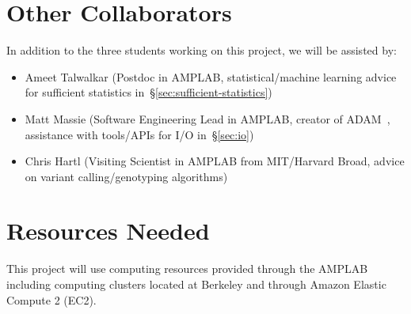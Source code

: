 \documentclass[11pt]{article}
\begin{document}
\section{Other Collaborators}
\label{sec:other-collaborators}

In addition to the three students working on this project, we will be assisted by:

\begin{itemize}
\item Ameet Talwalkar (Postdoc in AMPLAB, statistical/machine learning advice for sufficient statistics in~\S\ref{sec:sufficient-statistics})
\item Matt Massie (Software Engineering Lead in AMPLAB, creator of ADAM~\cite{adam}, assistance with tools/APIs for I/O
in~\S\ref{sec:io})
\item Chris Hartl (Visiting Scientist in AMPLAB from MIT/Harvard Broad, advice on variant calling/genotyping algorithms)
\end{itemize}

\small

\section{Resources Needed}
\label{sec:resources-needed}

This project will use computing resources provided through the AMPLAB including computing clusters located at Berkeley and through
Amazon Elastic Compute 2 (EC2).




\end{document}
